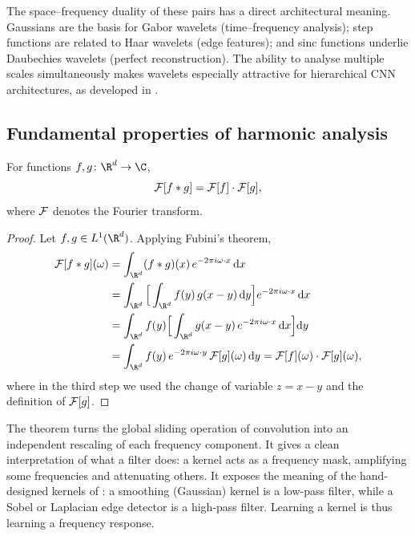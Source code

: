 The space--frequency duality of these pairs has a direct architectural meaning.
Gaussians are the basis for Gabor wavelets (time--frequency analysis); step
functions are related to Haar wavelets (edge features); and sinc functions
underlie Daubechies wavelets (perfect reconstruction). The ability to analyse
multiple scales simultaneously makes wavelets especially attractive for
hierarchical CNN architectures, as developed in
.

\subsection{Fundamental properties of harmonic analysis}
\label{sec:grids:harmonic-properties}

\begin{theorem}
\label{thm:grids:conv-theorem}
For functions $f, g \colon \R^d \to \C$,
\[
  \mathcal{F}[f * g] = \mathcal{F}[f] \cdot \mathcal{F}[g],
\]
where $\mathcal{F}$ denotes the Fourier transform.
\end{theorem}

\begin{proof}
Let $f, g \in L^1(\R^d)$. Applying Fubini's theorem,
\begin{align}
\Ft[f \conv g](\omega)
  &= \int_{\R^d} (f \conv g)(x)\, e^{-2\pi i\omega \cdot x}\, \mathrm{d}x \nonumber \\
  &= \int_{\R^d} \Big[\int_{\R^d} f(y)\,g(x-y)\, \mathrm{d}y\Big]
       e^{-2\pi i\omega \cdot x}\, \mathrm{d}x \nonumber \\
  &= \int_{\R^d} f(y) \Big[\int_{\R^d} g(x-y)\, e^{-2\pi i\omega \cdot x}\, \mathrm{d}x\Big] \mathrm{d}y \nonumber \\
  &= \int_{\R^d} f(y)\, e^{-2\pi i\omega \cdot y}\, \Ft[g](\omega)\, \mathrm{d}y
   = \Ft[f](\omega) \cdot \Ft[g](\omega),
\end{align}
where in the third step we used the change of variable $z = x - y$ and the
definition of $\mathcal{F}[g]$.
\end{proof}

The theorem turns the global sliding operation of convolution into an
independent rescaling of each frequency component. It gives a clean
interpretation of what a filter does: a kernel acts as a frequency mask,
amplifying some frequencies and attenuating others. It exposes the meaning of
the hand-designed kernels of : a smoothing (Gaussian)
kernel is a low-pass filter, while a Sobel or Laplacian edge detector is a
high-pass filter. Learning a kernel is thus learning a frequency response.

